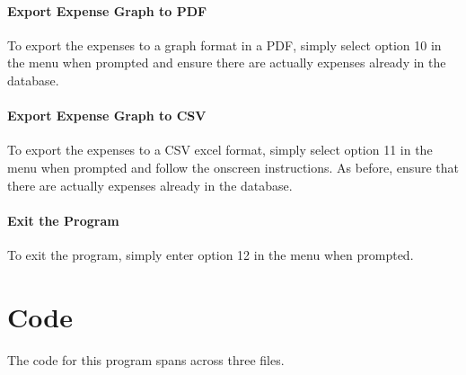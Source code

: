 \documentclass[11pt]{article}
\begin{document}
  \paragraph{Export Expense Graph to PDF}
  To export the expenses to a graph format in a PDF, simply select option 10 in the menu when prompted and ensure there are actually expenses already in the database.
  \paragraph{Export Expense Graph to CSV}
  To export the expenses to a CSV excel format, simply select option 11 in the menu when prompted and follow the onscreen instructions. As before, ensure that there are actually expenses already in the database.
  \paragraph{Exit the Program}
  To exit the program, simply enter option 12 in the menu when prompted.
  
  \section{Code}
  The code for this program spans across three files.
\end{document}
